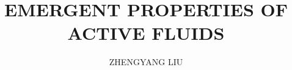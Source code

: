 

\phd %

%
\title{\bf EMERGENT PROPERTIES OF ACTIVE FLUIDS}
\author{ZHENGYANG LIU}


\abstract{}

\copyrightpage       %

\acknowledgements{}
\dedication{}


\beforepreface

\figurespage

\afterpreface

